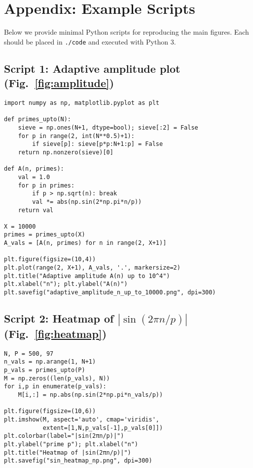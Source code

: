 \documentclass[12pt]{article}
\theoremstyle{definition}
\theoremstyle{remark}
\begin{document}




\clearpage
\appendix
\section*{Appendix: Example Scripts}

Below we provide minimal Python scripts for reproducing the main figures. Each should be placed in \texttt{./code} and executed with Python 3.

\subsection*{Script 1: Adaptive amplitude plot (Fig.~\ref{fig:amplitude})}
\begin{verbatim}
import numpy as np, matplotlib.pyplot as plt

def primes_upto(N):
    sieve = np.ones(N+1, dtype=bool); sieve[:2] = False
    for p in range(2, int(N**0.5)+1):
        if sieve[p]: sieve[p*p:N+1:p] = False
    return np.nonzero(sieve)[0]

def A(n, primes):
    val = 1.0
    for p in primes:
        if p > np.sqrt(n): break
        val *= abs(np.sin(2*np.pi*n/p))
    return val

X = 10000
primes = primes_upto(X)
A_vals = [A(n, primes) for n in range(2, X+1)]

plt.figure(figsize=(10,4))
plt.plot(range(2, X+1), A_vals, '.', markersize=2)
plt.title("Adaptive amplitude A(n) up to 10^4")
plt.xlabel("n"); plt.ylabel("A(n)")
plt.savefig("adaptive_amplitude_n_up_to_10000.png", dpi=300)
\end{verbatim}

\subsection*{Script 2: Heatmap of $|\sin(2\pi n/p)|$ (Fig.~\ref{fig:heatmap})}
\begin{verbatim}
N, P = 500, 97
n_vals = np.arange(1, N+1)
p_vals = primes_upto(P)
M = np.zeros((len(p_vals), N))
for i,p in enumerate(p_vals):
    M[i,:] = np.abs(np.sin(2*np.pi*n_vals/p))

plt.figure(figsize=(10,6))
plt.imshow(M, aspect='auto', cmap='viridis',
           extent=[1,N,p_vals[-1],p_vals[0]])
plt.colorbar(label="|sin(2πn/p)|")
plt.ylabel("prime p"); plt.xlabel("n")
plt.title("Heatmap of |sin(2πn/p)|")
plt.savefig("sin_heatmap_np.png", dpi=300)
\end{verbatim}
\end{document}
